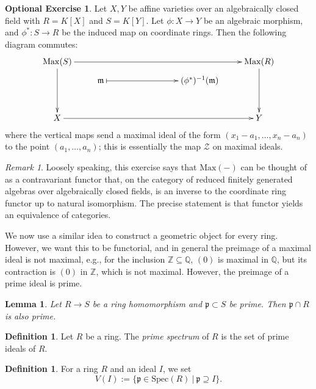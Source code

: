 \documentclass{amsart}[12pt]
\newcommand{\Q}{\mathbb{Q}}
\newcommand{\Z}{\mathbb{Z}}
\newcommand{\cZ}{\mathcal{Z}}
\newcommand{\fp}{{\mathfrak p}}
\newcommand{\fm}{{\mathfrak m}}
\newcommand{\DEF}[1]{\emph{#1}\index{#1}}
\numberwithin{equation}{section}
\theoremstyle{plain} %
\newtheorem{lem}[equation]{Lemma}
\theoremstyle{definition}
\newtheorem{defn}[equation]{Definition}
\newtheorem{exer}[equation]{Optional Exercise}
\theoremstyle{remark}
\newtheorem{rem}[equation]{Remark}
\newcommand{\Max}{\mathrm{Max}}
\newcommand{\Spec}{\mathrm{Spec}}
\begin{document}
\begin{exer} Let $X,Y$ be affine varieties over an algebraically closed field with $R=K[X]$ and $S=K[Y]$. Let $\phi:X\to Y$ be an algebraic morphism, and $\phi^*: S\to R$ be the induced map on coordinate rings. Then the following diagram commutes:
\[ \xymatrix@R=2mm{ \Max(S) \ar[rrrrr]\ar[dddd] &&& & & \Max(R) \ar[dddd]\\
& \fm  \ar@{|->}[rrr] &&& (\phi^*)^{-1}(\fm) & \\
\\
\\
X \ar[rrrrr] &&&&& Y}\]
where the vertical maps send a maximal ideal of the form $(x_1-a_1,\dots,x_n-a_n)$ to the point $(a_1,\dots,a_n)$; this is essentially the map $\cZ$ on maximal ideals.
\end{exer}

\begin{rem}
Loosely speaking, this exercise says that $\Max(-)$ can be thought of as a contravariant functor that, on the category of reduced finitely generated algebras over algebraically closed fields, is an inverse to the coordinate ring functor up to natural isomorphism. The precise statement is that functor yields an equivalence of categories.
\end{rem}


We now use a similar idea to construct a geometric object for every ring. However, we want this to be functorial, and in general the preimage of a maximal ideal is not maximal, e.g., for the inclusion $\Z\subseteq \Q$, $(0)$ is maximal in $\Q$, but its contraction is $(0)$ in $\Z$, which is not maximal. However, the preimage of a prime ideal is prime.

\begin{lem} Let $R\to S$ be a ring homomorphism and $\fp\subset S$ be prime. Then $\fp \cap R$ is also prime.
\end{lem}

\begin{defn} Let $R$ be a ring. The \DEF{prime spectrum} of $R$ is the set of prime ideals of $R$.
\end{defn}

\begin{defn} For a ring $R$ and an ideal $I$, we set
\[ V(I) := \{ \fp \in \Spec(R) \ | \ \fp \supseteq I\}.\]
\end{defn}
\end{document}

